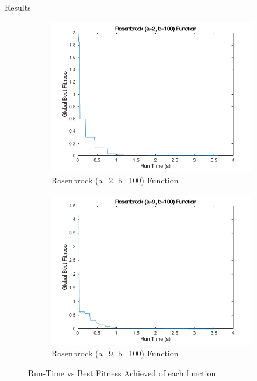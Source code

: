 \documentclass{beamer}
\begin{document}
\begin{frame}{Results}
\begin{figure}
  \begin{subfigure}[b]{0.4\textwidth}
    \includegraphics[width=\textwidth]{img/summary/rosenbrock2-100}
    \caption{Rosenbrock (a=2, b=100) Function}
  \end{subfigure}
  \begin{subfigure}[b]{0.4\textwidth}
    \includegraphics[width=\textwidth]{img/summary/rosenbrock9-100}
    \caption{Rosenbrock (a=9, b=100) Function}
  \end{subfigure}
  \caption{Run-Time vs Best Fitness Achieved of each function}
\end{figure}
\end{frame}
\end{document}
